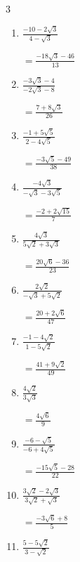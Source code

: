 \begin{multicols}{3}
\begin{enumerate}
        $\displaystyle =\frac{9\sqrt{2}+13}{7}$

  \item $\displaystyle \frac{-10-2\sqrt{3}}{4-\sqrt{3}}$

        $\displaystyle =\frac{-18\sqrt{3}-46}{13}$

  \item $\displaystyle \frac{-3\sqrt{3}-4}{-2\sqrt{3}-8}$

        $\displaystyle =\frac{7+8\sqrt{3}}{26}$

\columnbreak %

  \item $\displaystyle \frac{-1+5\sqrt{5}}{2-4\sqrt{5}}$

        $\displaystyle =\frac{-3\sqrt{5}-49}{38}$

  \item $\displaystyle \frac{-4\sqrt{3}}{-\sqrt{3}-3\sqrt{5}}$

        $\displaystyle =\frac{-2+2\sqrt{15}}{7}$

  \item $\displaystyle \frac{4\sqrt{3}}{5\sqrt{2}+3\sqrt{3}}$

        $\displaystyle =\frac{20\sqrt{6}-36}{23}$

  \item $\displaystyle \frac{2\sqrt{2}}{-\sqrt{3}+5\sqrt{2}}$

        $\displaystyle =\frac{20+2\sqrt{6}}{47}$

  \item $\displaystyle \frac{-1-4\sqrt{2}}{1-5\sqrt{2}}$

        $\displaystyle =\frac{41+9\sqrt{2}}{49}$

\columnbreak %

  \item $\displaystyle \frac{4\sqrt{2}}{3\sqrt{3}}$

        $\displaystyle =\frac{4\sqrt{6}}{9}$

  \item $\displaystyle \frac{-6-\sqrt{5}}{-6+4\sqrt{5}}$

        $\displaystyle =\frac{-15\sqrt{5}-28}{22}$

  \item $\displaystyle \frac{3\sqrt{2}-2\sqrt{3}}{3\sqrt{2}+\sqrt{3}}$

        $\displaystyle =\frac{-3\sqrt{6}+8}{5}$

  \item $\displaystyle \frac{5-5\sqrt{2}}{3-\sqrt{2}}$


\end{enumerate}
\end{multicols}
